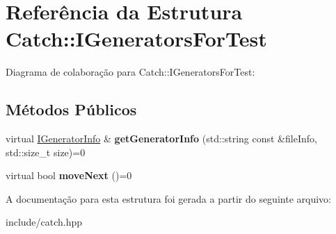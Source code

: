 \hypertarget{structCatch_1_1IGeneratorsForTest}{}\section{Referência da Estrutura Catch\+:\+:I\+Generators\+For\+Test}
\label{structCatch_1_1IGeneratorsForTest}


Diagrama de colaboração para Catch\+:\+:I\+Generators\+For\+Test\+:
\subsection*{Métodos Públicos}
\begin{DoxyCompactItemize}
\item 
virtual \hyperlink{structCatch_1_1IGeneratorInfo}{I\+Generator\+Info} \& {\bfseries get\+Generator\+Info} (std\+::string const \&file\+Info, std\+::size\+\_\+t size)=0\hypertarget{structCatch_1_1IGeneratorsForTest_a180d84e858840188e4c3788e47eefdb0}{}\label{structCatch_1_1IGeneratorsForTest_a180d84e858840188e4c3788e47eefdb0}

\item 
virtual bool {\bfseries move\+Next} ()=0\hypertarget{structCatch_1_1IGeneratorsForTest_adab31832d529fc584fd63164e0a1c8ad}{}\label{structCatch_1_1IGeneratorsForTest_adab31832d529fc584fd63164e0a1c8ad}

\end{DoxyCompactItemize}


A documentação para esta estrutura foi gerada a partir do seguinte arquivo\+:\begin{DoxyCompactItemize}
\item 
include/catch.\+hpp\end{DoxyCompactItemize}
